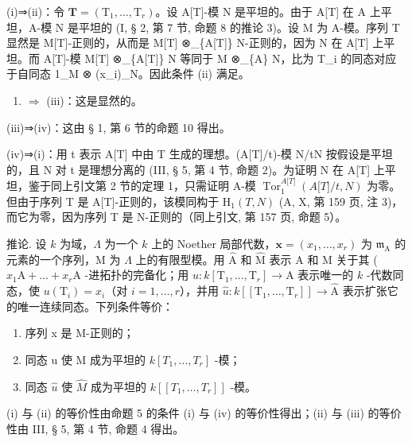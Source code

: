 (i)⇒(ii)：令 \(\mathbf{T} = (\mathrm{T}_{1}, \ldots, \mathrm{T}_{r})\)。设 A{[}T{]}-模 N 是平坦的。由于 A{[}T{]} 在 A 上平坦，A-模 N 是平坦的 (I, § 2, 第 7 节, 命题 8 的推论 3)。设 M 为 A-模。序列 T 显然是 M{[}T{]}-正则的，从而是 M{[}T{]} ⊗\_\{A{[}T{]}\} N-正则的，因为 N 在 A{[}T{]} 上平坦。而 A{[}T{]}-模 M{[}T{]} ⊗\_\{A{[}T{]}\} N 等同于 M ⊗\_\{A\} N，比为 T\_i 的同态对应于自同态 1\_M ⊗ (x\_i)\_N。因此条件 (ii) 满足。

\begin{enumerate}
\def\labelenumi{(\roman{enumi})}
\setcounter{enumi}{1}
\tightlist
\item
  \(\Rightarrow\) (iii)：这是显然的。
\end{enumerate}

(iii)⇒(iv)：这由 § 1, 第 6 节的命题 10 得出。

(iv)⇒(i)：用 t 表示 A{[}T{]} 中由 T 生成的理想。(A{[}T{]}/t)-模 N/tN 按假设是平坦的，且 N 对 t 是理想分离的 (III, § 5, 第 4 节, 命题 2)。为证明 N 在 A{[}T{]} 上平坦，鉴于同上引文第 2 节的定理 1，只需证明 A-模 \(\operatorname{Tor}_{1}^{A{[}T{]}}(A{[}T{]}/t,N)\) 为零。但由于序列 T 是 A{[}T{]}-正则的，该模同构于 \(\mathrm{H}_{1}(T,N)\) (A, X, 第 159 页, 注 3)，而它为零，因为序列 T 是 N-正则的（同上引文, 第 157 页, 命题 5）。

推论. 设 \(k\) 为域，\(\Lambda\) 为一个 \(k\) 上的 Noether 局部代数，\(\mathbf{x} = (x_1, \ldots, x_r)\) 为 \(\mathfrak{m}_{\mathrm{A}}\) 的元素的一个序列，M 为 \(\Lambda\) 上的有限型模。用 \(\widehat{\mathrm{A}}\) 和 \(\widehat{\mathrm{M}}\) 表示 A 和 M 关于其 ( \(x_1\mathrm{A} + \ldots + x_r\mathrm{A}\) -进拓扑的完备化；用 \(u: k[\mathrm{T}_1, \ldots, \mathrm{T}_r] \longrightarrow \mathrm{A}\) 表示唯一的 \(k\) -代数同态，使 \(u(\mathrm{T}_i) = x_i\)（对 \(i = 1, \ldots, r\)），并用 \(\hat{u}: k[[\mathrm{T}_1, \ldots, \mathrm{T}_r]] \longrightarrow \widehat{\mathrm{A}}\) 表示扩张它的唯一连续同态。下列条件等价：

\begin{enumerate}
\def\labelenumi{(\roman{enumi})}
\item
  序列 x 是 M-正则的；
\item
  同态 u 使 M 成为平坦的 \(k[T_{1},\ldots,T_{r}]\) -模；
\item
  同态 \(\hat{u}\) 使 \(\hat{M}\) 成为平坦的 \(k[[T_{1},\ldots,T_{r}]]\) -模。
\end{enumerate}

(i) 与 (ii) 的等价性由命题 5 的条件 (i) 与 (iv) 的等价性得出；(ii) 与 (iii) 的等价性由 III, § 5, 第 4 节, 命题 4 得出。

